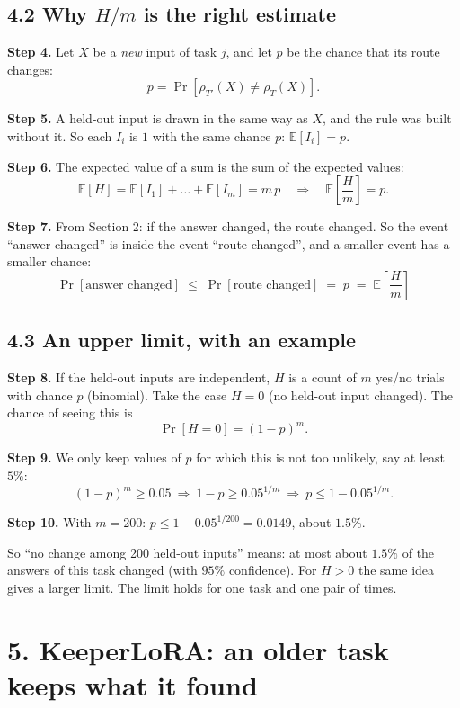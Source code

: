 \documentclass[11pt,a4paper]{article}
\newcommand{\step}[1]{\textbf{Step #1.}}
\begin{document}
\subsection*{4.2 Why $H/m$ is the right estimate}

\step{4} Let $X$ be a \emph{new} input of task $j$, and let $p$ be the chance that its route changes:
\[ p = \Pr[\rho_{T'}(X) \neq \rho_T(X)]. \]

\step{5} A held-out input is drawn in the same way as $X$, and the rule was built without it. So each
$I_i$ is $1$ with the same chance $p$: \quad $\mathbb{E}[I_i] = p$.

\step{6} The expected value of a sum is the sum of the expected values:
\[ \mathbb{E}[H] = \mathbb{E}[I_1] + \dots + \mathbb{E}[I_m] = m\,p
   \quad\Longrightarrow\quad \mathbb{E}\!\left[\frac{H}{m}\right] = p . \]

\step{7} From Section 2: if the answer changed, the route changed. So the event ``answer changed'' is
inside the event ``route changed'', and a smaller event has a smaller chance:
\[ \boxed{\ \Pr[\text{answer changed}] \;\le\; \Pr[\text{route changed}] \;=\; p \;=\; \mathbb{E}\!\left[\frac{H}{m}\right]\ } \]

\subsection*{4.3 An upper limit, with an example}

\step{8} If the held-out inputs are independent, $H$ is a count of $m$ yes/no trials with chance $p$
(binomial). Take the case $H = 0$ (no held-out input changed). The chance of seeing this is
\[ \Pr[H=0] = (1-p)^m . \]

\step{9} We only keep values of $p$ for which this is not too unlikely, say at least $5\%$:
\[ (1-p)^m \ge 0.05 \ \Longrightarrow\ 1-p \ge 0.05^{1/m} \ \Longrightarrow\ p \le 1 - 0.05^{1/m} . \]

\step{10} With $m = 200$: \quad $p \le 1 - 0.05^{1/200} = 0.0149$, about $1.5\%$.

So ``no change among 200 held-out inputs'' means: at most about $1.5\%$ of the answers of this task
changed (with $95\%$ confidence). For $H > 0$ the same idea gives a larger limit. The limit holds for
one task and one pair of times.

\section*{5. KeeperLoRA: an older task keeps what it found}
\end{document}

